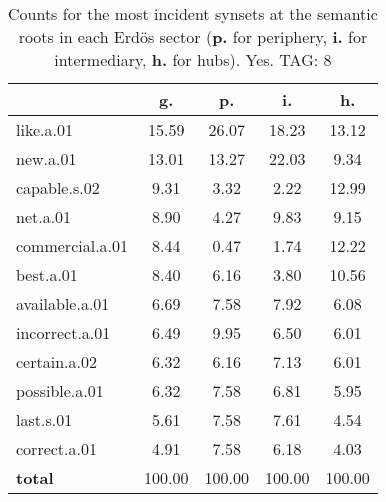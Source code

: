 \begin{table}[h!]
\begin{center}
\begin{tabular}{| l || c | c | c | c |}\hline
 & {\bf g.} & {\bf p.} & {\bf i.} & {\bf h.} \\\hline\hline
like.a.01 & 15.59  & 26.07  & 18.23  & 13.12 \\\hline
new.a.01 & 13.01  & 13.27  & 22.03  & 9.34 \\\hline
capable.s.02 & 9.31  & 3.32  & 2.22  & 12.99 \\\hline
net.a.01 & 8.90  & 4.27  & 9.83  & 9.15 \\\hline
commercial.a.01 & 8.44  & 0.47  & 1.74  & 12.22 \\\hline
best.a.01 & 8.40  & 6.16  & 3.80  & 10.56 \\\hline
available.a.01 & 6.69  & 7.58  & 7.92  & 6.08 \\\hline
incorrect.a.01 & 6.49  & 9.95  & 6.50  & 6.01 \\\hline
certain.a.02 & 6.32  & 6.16  & 7.13  & 6.01 \\\hline
possible.a.01 & 6.32  & 7.58  & 6.81  & 5.95 \\\hline
last.s.01 & 5.61  & 7.58  & 7.61  & 4.54 \\\hline
correct.a.01 & 4.91  & 7.58  & 6.18  & 4.03 \\\hline\hline
{{\bf total}} & 100.00  & 100.00  & 100.00  & 100.00 \\\hline
\end{tabular}
\caption{Counts for the most incident synsets at the semantic roots in each Erd\"os sector ({\bf p.} for periphery, {\bf i.} for intermediary, {\bf h.} for hubs). Yes. TAG: 8}
\end{center}
\end{table}